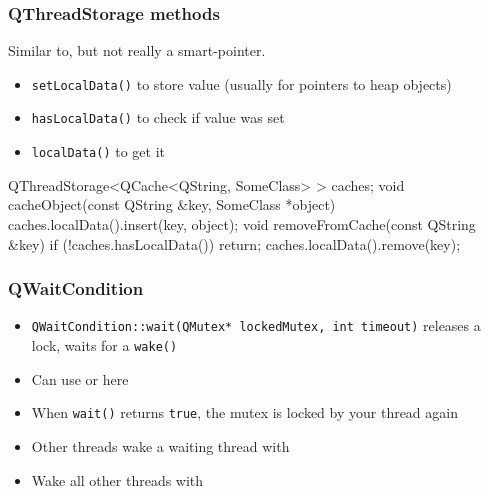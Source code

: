 \begin{slide}[fragile]
\frametitle{QThreadStorage methods}
Similar to, but not really a smart-pointer.
\begin{itemize}
\item \texttt{setLocalData()} to store value (usually for pointers to heap
    objects)
\item \texttt{hasLocalData()} to check if value was set
\item \texttt{localData()} to get it
\end{itemize}
\begin{cpp}
QThreadStorage<QCache<QString, SomeClass> > caches;
void cacheObject(const QString &key, SomeClass *object) {
    caches.localData().insert(key, object);
}
void removeFromCache(const QString &key) {
    if (!caches.hasLocalData())
        return;
    caches.localData().remove(key);
}
\end{cpp}
\end{slide}

\begin{slide}[fragile]
\frametitle{QWaitCondition}
\begin{itemize}
\item \texttt{QWaitCondition::wait(QMutex* lockedMutex, int timeout)} releases a
lock, waits for a \texttt{wake()}
\item Can use  or  here
\item When \texttt{wait()} returns \texttt{true}, the mutex is locked by your
thread again
\item Other threads wake a waiting thread with 
\item Wake all other threads with 
\end{itemize}
\end{slide}


